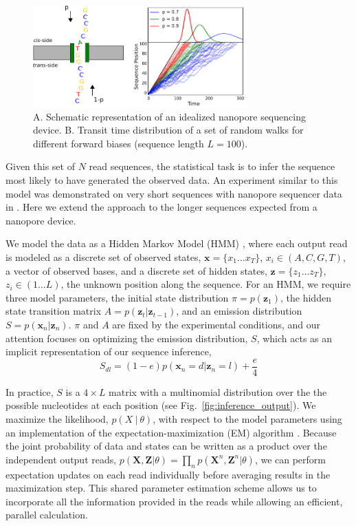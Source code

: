 \documentclass{biophys_letter}
\begin{document}
\begin{figure}%
  \centering
  \includegraphics[width=3.25in]{fig/fig1-withcartoon-jw-eps2pdf-cropped.pdf}
  \caption{A. Schematic representation of an idealized nanopore sequencing device. B. Transit time distribution of a set of random walks for different forward biases (sequence length $L=100$).}
  \label{fig:fig1}
\end{figure}

Given this set of $N$ read sequences, the statistical task is to infer the sequence most likely to have generated the observed data.
An experiment similar to this model was demonstrated on very short sequences with nanopore sequencer data in \cite{Ohshiro:2012}.
Here we extend the approach to the longer sequences expected from a nanopore device.


We model the data as a Hidden Markov Model (HMM) \cite{Rabiner:1989}, where each output read is modeled as a discrete set of observed states, $\mathbf{x}=\{x_{1}\dots x_{T}\}$, $x_i \in (A,C,G,T)$, a vector of observed bases, and a discrete set of hidden states, $\mathbf{z}=\{z_{1} \dots z_{T}\}$, $z_i \in (1 \dots L)$, the unknown position along the sequence.
For an HMM, we require three model parameters, the initial state distribution $\pi=p(\mathbf{z}_{1})$, the hidden state transition matrix $A=p(\mathbf{z}_{t}|\mathbf{z}_{t-1})$, and an emission distribution $S=p(\mathbf{x}_{n}|\mathbf{z}_{n})$. 
$\pi$ and $A$ are fixed by the experimental conditions, and our attention focuses on optimizing the emission distribution, $S$, which acts as an implicit representation of our sequence inference,
\begin{equation}
  S_{dl} = (1-e)p(\mathbf{x}_n = d |\mathbf{z}_{n} = l) + \frac{e}{4} 
\end{equation}

In practice, $S$ is a $4 \times L$ matrix with a multinomial distribution over the the possible nucleotides at each position (see Fig.~\ref{fig:inference_output}).
We maximize the likelihood, $p(X \:|\: \theta)$, with respect to the model parameters using an implementation of the expectation-maximization (EM) algorithm \cite{Baum:1970}.
Because the joint probability of data and states can be written as a product over the independent output reads, $p(\mathbf{X},\mathbf{Z}|\theta)=\prod_{n}p(\mathbf{X}^n,\mathbf{Z}^n|\theta)$, we can perform expectation updates on each read individually before averaging results in the maximization step.
This shared parameter estimation scheme allows us to incorporate all the information provided in the reads while allowing an efficient, parallel calculation.
\end{document}
